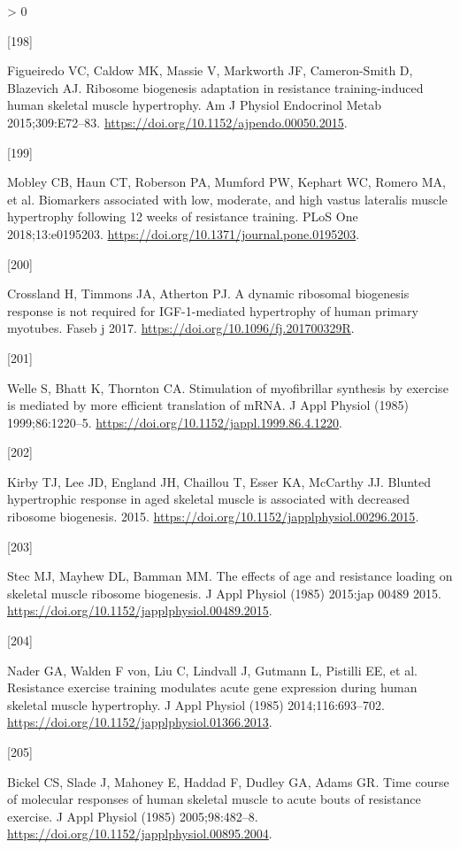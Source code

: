 \documentclass[twoside,10pt]{gihclass} %
\newlength{\cslhangindent}
\newlength{\csllabelwidth}
\newenvironment{CSLReferences}[3] %
 {%
  \setlength{\parindent}{0pt}
  \ifodd #1 \everypar{\setlength{\hangindent}{\cslhangindent}}\ignorespaces\fi
  \ifnum #2 > 0
  \setlength{\parskip}{#2\baselineskip}
  \fi
 }%
 {}
\newcommand{\CSLLeftMargin}[1]{\parbox[t]{\maxof{\widthof{#1}}{\csllabelwidth}}{#1}}
\newcommand{\CSLRightInline}[1]{\parbox[t]{\linewidth}{#1}}
\begin{document}
\begin{CSLReferences}{0}{0}
\leavevmode\hypertarget{ref-RN1644}{}%
\CSLLeftMargin{{[}198{]} }
\CSLRightInline{Figueiredo VC, Caldow MK, Massie V, Markworth JF, Cameron-Smith D, Blazevich AJ. Ribosome biogenesis adaptation in resistance training-induced human skeletal muscle hypertrophy. Am J Physiol Endocrinol Metab 2015;309:E72--83. \url{https://doi.org/10.1152/ajpendo.00050.2015}.}

\leavevmode\hypertarget{ref-RN2055}{}%
\CSLLeftMargin{{[}199{]} }
\CSLRightInline{Mobley CB, Haun CT, Roberson PA, Mumford PW, Kephart WC, Romero MA, et al. Biomarkers associated with low, moderate, and high vastus lateralis muscle hypertrophy following 12 weeks of resistance training. PLoS One 2018;13:e0195203. \url{https://doi.org/10.1371/journal.pone.0195203}.}

\leavevmode\hypertarget{ref-RN1929}{}%
\CSLLeftMargin{{[}200{]} }
\CSLRightInline{Crossland H, Timmons JA, Atherton PJ. A dynamic ribosomal biogenesis response is not required for IGF-1-mediated hypertrophy of human primary myotubes. Faseb j 2017. \url{https://doi.org/10.1096/fj.201700329R}.}

\leavevmode\hypertarget{ref-RN2155}{}%
\CSLLeftMargin{{[}201{]} }
\CSLRightInline{Welle S, Bhatt K, Thornton CA. Stimulation of myofibrillar synthesis by exercise is mediated by more efficient translation of mRNA. J Appl Physiol (1985) 1999;86:1220--5. \url{https://doi.org/10.1152/jappl.1999.86.4.1220}.}

\leavevmode\hypertarget{ref-RN1631}{}%
\CSLLeftMargin{{[}202{]} }
\CSLRightInline{Kirby TJ, Lee JD, England JH, Chaillou T, Esser KA, McCarthy JJ. Blunted hypertrophic response in aged skeletal muscle is associated with decreased ribosome biogenesis. 2015. \url{https://doi.org/10.1152/japplphysiol.00296.2015}.}

\leavevmode\hypertarget{ref-RN1656}{}%
\CSLLeftMargin{{[}203{]} }
\CSLRightInline{Stec MJ, Mayhew DL, Bamman MM. The effects of age and resistance loading on skeletal muscle ribosome biogenesis. J Appl Physiol (1985) 2015:jap 00489 2015. \url{https://doi.org/10.1152/japplphysiol.00489.2015}.}

\leavevmode\hypertarget{ref-RN1037}{}%
\CSLLeftMargin{{[}204{]} }
\CSLRightInline{Nader GA, Walden F von, Liu C, Lindvall J, Gutmann L, Pistilli EE, et al. Resistance exercise training modulates acute gene expression during human skeletal muscle hypertrophy. J Appl Physiol (1985) 2014;116:693--702. \url{https://doi.org/10.1152/japplphysiol.01366.2013}.}

\leavevmode\hypertarget{ref-RN1520}{}%
\CSLLeftMargin{{[}205{]} }
\CSLRightInline{Bickel CS, Slade J, Mahoney E, Haddad F, Dudley GA, Adams GR. Time course of molecular responses of human skeletal muscle to acute bouts of resistance exercise. J Appl Physiol (1985) 2005;98:482--8. \url{https://doi.org/10.1152/japplphysiol.00895.2004}.}


\end{CSLReferences}
\end{document}

